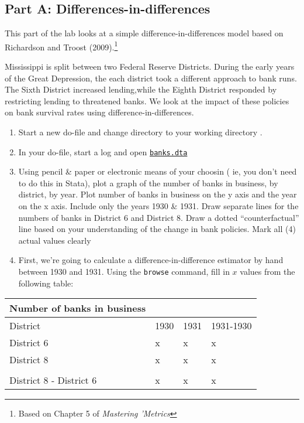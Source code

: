 \documentclass[11pt]{article}
\begin{document}
\hypertarget{part-a-differences-in-differences}{%
\subsection*{Part A:
Differences-in-differences}\label{part-a-differences-in-differences}}

This part of the lab looks at a simple difference-in-differences model
based on Richardson and Troost (2009).\footnote{Based on Chapter 5 of
  \emph{Mastering 'Metrics}}

Mississippi is split between two Federal Reserve Districts. During the
early years of the Great Depression, the each district took a different
approach to bank runs. The Sixth District increased lending,while the
Eighth District responded by restricting lending to threatened banks. We
look at the impact of these policies on bank survival rates using
difference-in-differences.

\begin{enumerate}
\def\labelenumi{\arabic{enumi}.}
\item
  Start a new do-file and change directory to your working directory .
\item
  In your do-file, start a log and open
  \href{../materials/banks.dta}{\texttt{banks.dta}}
\item
  Using pencil \& paper or electronic means of your choosin ( ie, you
  don't need to do this in Stata), plot a graph of the number of banks
  in business, by district, by year. Plot number of banks in business on
  the y axis and the year on the x axis. Include only the years 1930 \&
  1931. Draw separate lines for the numbers of banks in District 6 and
  District 8. Draw a dotted ``counterfactual'' line based on your
  understanding of the change in bank policies. Mark all (4) actual
  values clearly
\item
  First, we're going to calculate a difference-in-difference estimator
  by hand between 1930 and 1931. Using the \texttt{browse} command, fill
  in \(x\) values from the following table:\\
\end{enumerate}

\begin{longtable}[]{@{}llll@{}}
\toprule
Number of banks in business & & & \\
\midrule
\endhead
District & 1930 & 1931 & 1931-1930 \\
District 6 & x & x & x \\
District 8 & x & x & x \\
& & & \\
District 8 - District 6 & x & x & x \\
\bottomrule
\end{longtable}
\end{document}
